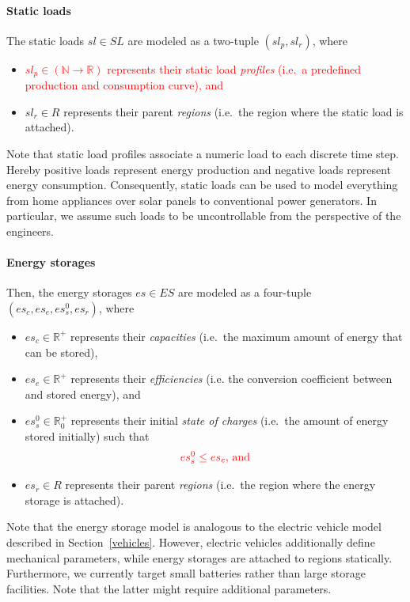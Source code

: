 \paragraph{Static loads}
\label{static_loads}

The static loads $sl \in SL$ are modeled as a two-tuple $(sl_p, sl_r)$, where
\begin{itemize}
	\item \textcolor{red}{$sl_p \in (\mathbb{N} \rightarrow \mathbb{R})$ represents their static load \textit{profiles} (i.e.\ a predefined production and consumption curve), and}
	\item $sl_r \in R$ represents their parent \textit{regions} (i.e.\ the region where the static load is attached).
\end{itemize}
Note that static load profiles associate a numeric load to each discrete time step. Hereby positive loads represent energy production and negative loads represent energy consumption. Consequently, static loads can be used to model everything from home appliances over solar panels to conventional power generators. In particular, we assume such loads to be uncontrollable from the perspective of the engineers.

\paragraph{Energy storages}
\label{energy_storages}

Then, the energy storages $es \in ES$ are modeled as a four-tuple $(es_c, es_e, es_s^0, es_r)$, where
\begin{itemize}
	\item $es_c \in \mathbb{R}^+$ represents their \textit{capacities} (i.e.\ the maximum amount of energy that can be stored),
	\item $es_e \in \mathbb{R}^+$ represents their \textit{efficiencies} (i.e. the conversion coefficient between  and stored energy), and
	\item $es_s^0 \in \mathbb{R}_0^+$ represents their initial \textit{state of charges} (i.e.\ the amount of energy stored initially) such that
	\[
		 \textcolor{red}{ es_s^0 \leq es_c \textrm{, and} }
	\]
	\item $es_r \in R$ represents their parent \textit{regions} (i.e.\ the region where the energy storage is attached).
\end{itemize}
Note that the energy storage model is analogous to the electric vehicle model described in Section~\ref{vehicles}. However, electric vehicles additionally define mechanical parameters, while energy storages are attached to regions statically. Furthermore, we currently target small batteries rather than large storage facilities. Note that the latter might require additional parameters. 

